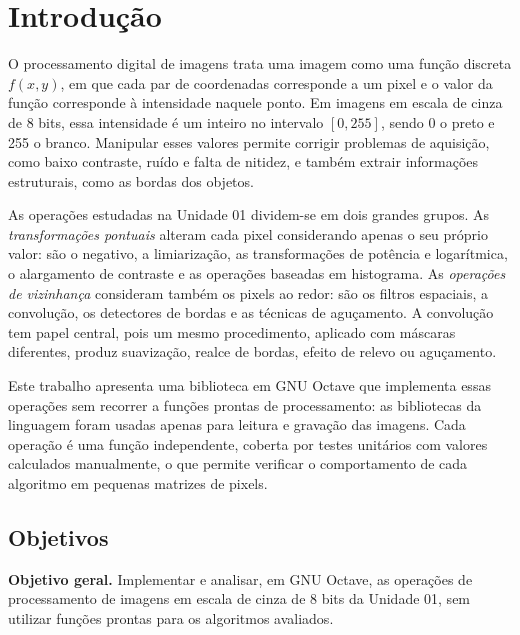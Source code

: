 \documentclass[11pt,a4paper]{article}
\begin{document}
\vspace{3mm}
\tableofcontents
\newpage

\section{Introdução}

O processamento digital de imagens trata uma imagem como uma função discreta $f(x,y)$, em que cada par de coordenadas corresponde a um pixel e o valor da função corresponde à intensidade naquele ponto. Em imagens em escala de cinza de 8 bits, essa intensidade é um inteiro no intervalo $[0,255]$, sendo 0 o preto e 255 o branco. Manipular esses valores permite corrigir problemas de aquisição, como baixo contraste, ruído e falta de nitidez, e também extrair informações estruturais, como as bordas dos objetos.

As operações estudadas na Unidade 01 dividem-se em dois grandes grupos. As \emph{transformações pontuais} alteram cada pixel considerando apenas o seu próprio valor: são o negativo, a limiarização, as transformações de potência e logarítmica, o alargamento de contraste e as operações baseadas em histograma. As \emph{operações de vizinhança} consideram também os pixels ao redor: são os filtros espaciais, a convolução, os detectores de bordas e as técnicas de aguçamento. A convolução tem papel central, pois um mesmo procedimento, aplicado com máscaras diferentes, produz suavização, realce de bordas, efeito de relevo ou aguçamento.

Este trabalho apresenta uma biblioteca em GNU Octave que implementa essas operações sem recorrer a funções prontas de processamento: as bibliotecas da linguagem foram usadas apenas para leitura e gravação das imagens. Cada operação é uma função independente, coberta por testes unitários com valores calculados manualmente, o que permite verificar o comportamento de cada algoritmo em pequenas matrizes de pixels.

\subsection{Objetivos}

\textbf{Objetivo geral.} Implementar e analisar, em GNU Octave, as operações de processamento de imagens em escala de cinza de 8 bits da Unidade 01, sem utilizar funções prontas para os algoritmos avaliados.
\end{document}

